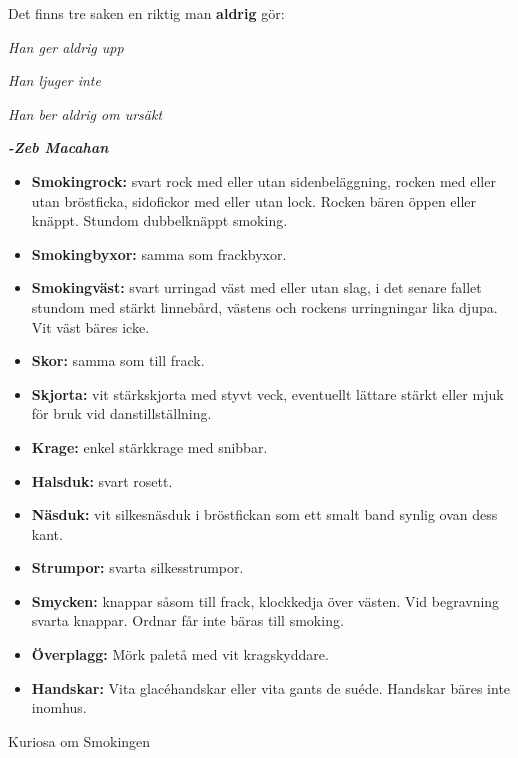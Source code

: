     Det finns tre saken en riktig man \textbf{aldrig} gör:

    \textit{Han ger aldrig upp}
    
    \textit{Han ljuger inte}
    
    \textit{Han ber aldrig om ursäkt}
    
    \textit{\textbf{-Zeb Macahan}} 


    \begin{itemize}
        
        \item[]\textbf{Smokingrock:} svart rock med eller utan sidenbeläggning, rocken med eller utan bröstficka, sidofickor med eller utan lock. Rocken bären öppen eller knäppt. Stundom dubbelknäppt smoking.
        
        \item[]\textbf{Smokingbyxor:} samma som frackbyxor.
        
        \item[]\textbf{Smokingväst:} svart urringad väst med eller utan slag, i det senare fallet stundom med stärkt linnebård, västens och rockens urringningar lika djupa. Vit väst bäres icke.
        
        \item[]\textbf{Skor:} samma som till frack.
        
        \item[]\textbf{Skjorta:} vit stärkskjorta med styvt veck, eventuellt lättare stärkt eller mjuk för bruk vid danstillställning.
        
        \item[]\textbf{Krage:} enkel stärkkrage med snibbar.
        
        \item[]\textbf{Halsduk:} svart rosett.
        
        \item[]\textbf{Näsduk:} vit silkesnäsduk i bröstfickan som ett smalt band synlig ovan dess kant.
        
        \item[]\textbf{Strumpor:} svarta silkesstrumpor.
        
        \item[]\textbf{Smycken:} knappar såsom till frack, klockkedja över västen. Vid begravning svarta knappar. Ordnar får inte bäras till smoking.
        
        \item[]\textbf{Överplagg:} Mörk paletå med vit kragskyddare.
        
        \item[]\textbf{Handskar:} Vita glacéhandskar eller vita gants de suéde. Handskar bäres inte inomhus.
        
    \end{itemize}
    Kuriosa om Smokingen

